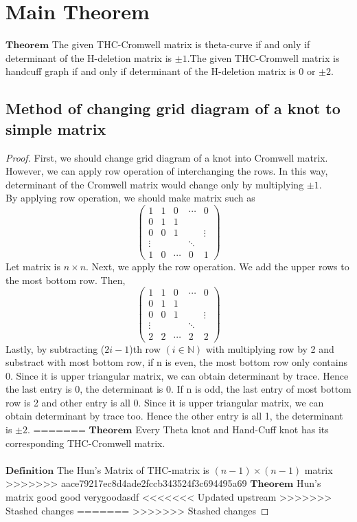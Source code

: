 \documentclass{article}
\theoremstyle{definition}
\begin{document}
\section{Main Theorem}
$\mathbf{Theorem}$ The given THC-Cromwell matrix is theta-curve if and only if determinant of the H-deletion matrix is $\pm 1$.The given THC-Cromwell matrix is handcuff graph if and only if determinant of the H-deletion matrix is 0 or $\pm 2$.

\subsection{Method of changing grid diagram of a knot to simple matrix}
\begin{proof}
First, we should change grid diagram of a knot into Cromwell matrix. However, we can apply row operation of interchanging the rows. In this way, determinant of the Cromwell matrix would change only by multiplying $\pm 1$.\\
By applying row operation, we should make matrix such as
    $$\begin{pmatrix} 
    1 & 1 & 0 & \cdots & 0\\
    0 & 1 & 1 &  &  \\
    0 & 0 & 1 & & \vdots\\ 
    \vdots & & & \ddots & \\
    1 & 0 & \cdots & 0 & 1
    \end{pmatrix}$$
Let matrix is $n\times n$.
Next, we apply the row operation. We add the upper rows to the most bottom row. Then,
    $$\begin{pmatrix} 
    1 & 1 & 0 & \cdots & 0\\
    0 & 1 & 1 &  &  \\
    0 & 0 & 1 & & \vdots\\ 
    \vdots & & & \ddots & \\
    2 & 2 & \cdots & 2 & 2
    \end{pmatrix}$$
Lastly, by subtracting ($2i-1$)th row $(i \in \mathbb{N})$ with multiplying row by 2 and substract with most bottom row, if n is even, the most bottom row only contains 0. Since it is upper triangular matrix, we can obtain determinant by trace. Hence the last entry is 0, the determinant is 0. If n is odd, the last entry of most bottom row is 2 and other entry is all 0. Since it is upper triangular matrix, we can obtain determinant by trace too. Hence the other entry is all 1, the determinant is $\pm 2$.
=======
$\mathbf{Theorem}$ Every Theta knot and Hand-Cuff knot has its corresponding THC-Cromwell matrix. \\ \\
$\mathbf{Definition}$ The Hun's Matrix of THC-matrix is $(n-1)\times(n-1)$ matrix \\
>>>>>>> aace79217ec8d4ade2fccb343524f3c694495a69
$\mathbf{Theorem}$ 
Hun's matrix good good verygoodasdf
<<<<<<< Updated upstream
>>>>>>> Stashed changes
=======
>>>>>>> Stashed changes




\end{proof}
\end{document}
